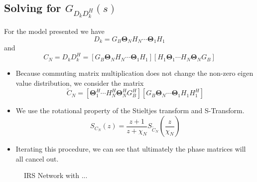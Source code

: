 \documentclass[12pt,a4paper]{report}
\begin{document}
\subsection{Solving for $G_{D_kD_k^H}(s)$}\label{Polynomial_terms}
For the model presented we have 
\begin{equation}
D_k = G_B \boldsymbol{\Theta}_N H_N \cdots \boldsymbol{\Theta}_1 H_1
\end{equation}
and 
\begin{equation}
C_N = D_kD_k^H = [G_B \boldsymbol{\Theta}_N H_N \cdots \boldsymbol{\Theta}_1 H_1]
[H_1 \boldsymbol{\Theta}_1 \cdots H_N \boldsymbol{\Theta}_N G_B]
\end{equation}
\begin{itemize}
\item 
	Because commuting matrix multiplication does not change the non-zero eigen value distribution, we consider 
	the matrix 
\begin{equation}
\tilde{C}_N = [\boldsymbol{\Theta}_1^H \cdots H_N^H \boldsymbol{\Theta}_N^H G_B^H][G_B \boldsymbol{\Theta}_N  \cdots \boldsymbol{\Theta}_1 H_1 H_1^H]
\end{equation}

\item 
	We use the rotational property of the Stieltjes transform and S-Transform. 
\begin{equation}
S_{C_N}(z) = \frac{z+1}{z+\chi_N} S_{\tilde{C}_N}(\frac{z}{\chi_N})
\end{equation}

\item 
	Iterating this procedure, we can see that ultimately the phase matrices will all cancel out.

\end{itemize}



\begin{figure}

\caption{IRS Network with ...}
\label{irs_figure}
\end{figure}
\end{document}
